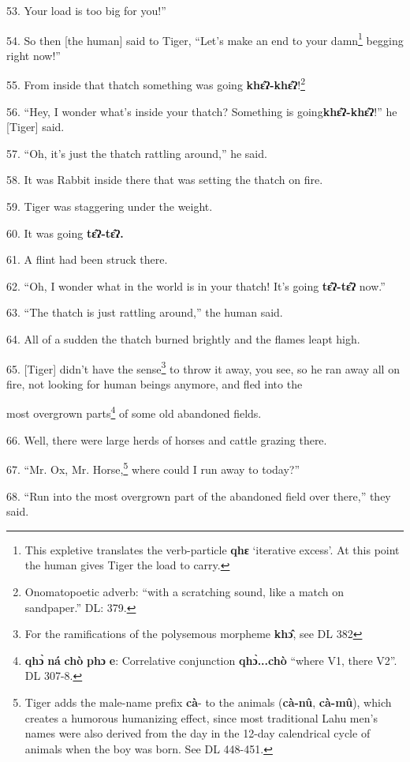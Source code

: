 53. Your load is too big for you!''

54. So then [the human] said to Tiger, ``Let's make an end to your damn\footnote{This expletive translates the verb-particle \textbf{qhɛ} `iterative excess'. At this point the human gives Tiger the load to carry.} begging
right now!''

55. From inside that thatch something was going \textbf{khɛ̂ʔ-khɛ̂ʔ}!\footnote{Onomatopoetic adverb: ``with a scratching sound, like a match on sandpaper.'' DL: 379.}

56. ``Hey, I wonder what's inside your thatch? Something is going\textbf{khɛ̂ʔ-khɛ̂ʔ}!''
he [Tiger] said.

57. ``Oh, it's just the thatch rattling around,'' he said.

58. It was Rabbit inside there that was setting the thatch on fire.

59. Tiger was staggering under the weight.

60. It was going \textbf{tɛ̂ʔ-tɛ̂ʔ.}

61. A flint had been struck there.

62. ``Oh, I wonder what in the world is in your thatch! It's going \textbf{tɛ̂ʔ-tɛ̂ʔ}
now.''

63. ``The thatch is just rattling around,'' the human said.

64. All of a sudden the thatch burned brightly and the flames leapt high.

65. [Tiger] didn't have the sense\footnote{For the ramifications of the polysemous morpheme \textbf{khɔ̂}, see DL 382} to throw it away, you see, so he ran away
all on fire, not looking for human beings anymore, and fled into the

most overgrown parts\footnote{\textbf{qhɔ̀} \textbf{ná} \textbf{chò} \textbf{phɔ} \textbf{e}: Correlative conjunction \textbf{qhɔ̀...chò }``where V1, there V2''. DL 307-8.} of some old abandoned fields.

66. Well, there were large herds of horses and cattle grazing there.

67. ``Mr. Ox, Mr. Horse,\footnote{Tiger adds the male-name prefix \textbf{cà}- to the animals (\textbf{cà-nû}, \textbf{cà-mû}), which creates a humorous humanizing effect, since most traditional Lahu men's names were also derived from the day in the 12-day calendrical cycle of animals when the boy was born. See DL 448-451.} where could I run away to today?''

68. ``Run into the most overgrown part of the abandoned field over there,'' they
said.

